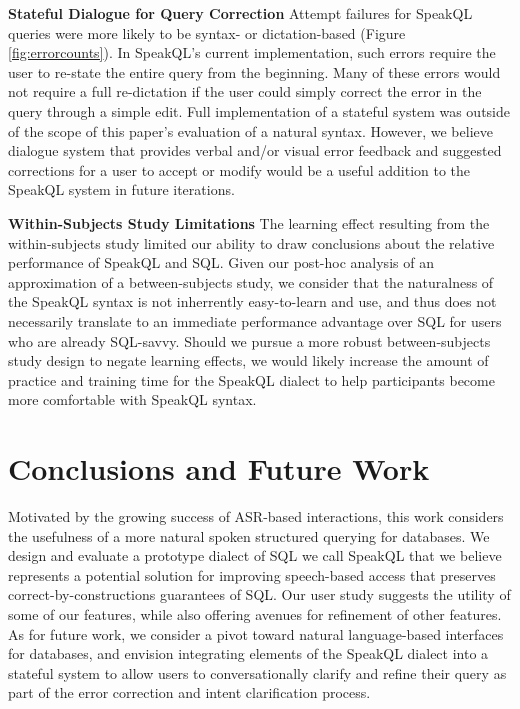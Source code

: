 \textbf{Stateful Dialogue for Query Correction} Attempt failures for SpeakQL queries were more likely to be syntax- or dictation-based (Figure \ref{fig:errorcounts}). In SpeakQL's current implementation, such errors require the user to re-state the entire query from the beginning. Many of these errors would not require a full re-dictation if the user could simply correct the error in the query through a simple edit. Full  implementation of a stateful system was outside of the scope of this paper's evaluation of a natural syntax. However, we believe dialogue system that provides verbal and/or visual error feedback and suggested corrections for a user to accept or modify would be a useful addition to the SpeakQL system in future iterations.

\textbf{Within-Subjects Study Limitations} The learning effect resulting from the within-subjects study limited our ability to draw conclusions about the relative performance of SpeakQL and SQL. 
Given our post-hoc analysis of an approximation of a between-subjects study, we consider that the naturalness of the SpeakQL syntax is not inherrently easy-to-learn and use, and thus does not necessarily translate to an immediate performance advantage over SQL for users who are already SQL-savvy. 
Should we pursue a more robust between-subjects study design to negate learning effects, we would likely increase the amount of practice and training time for the SpeakQL dialect to help participants become more comfortable with SpeakQL syntax. 





\section{Conclusions and Future Work}


Motivated by the growing success of ASR-based interactions, this work considers the usefulness of a more natural spoken structured querying for databases. 
We design and evaluate a prototype dialect of SQL we call SpeakQL that we believe represents a potential solution for improving speech-based access that preserves correct-by-constructions guarantees of SQL. 
Our user study suggests the utility of some of our features, while also offering avenues for refinement of other features.
As for future work, we consider a pivot toward natural language-based interfaces for databases, and envision integrating elements of the SpeakQL dialect into a stateful system to allow users to conversationally clarify and refine their query as part of the error correction and intent clarification process.



